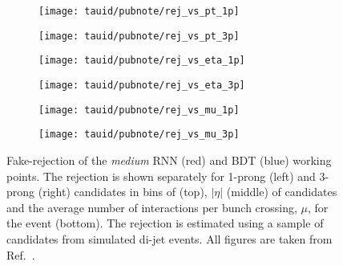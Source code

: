 \begin{figure}[htbp]

  \begin{subfigure}{0.498\textwidth}
    \texttt{[image: tauid/pubnote/rej\_vs\_pt\_1p]}
    \subcaption{}%
    \label{fig:tauid_faketau_rej_a}
  \end{subfigure}\hfill%
  \begin{subfigure}{0.498\textwidth}
    \texttt{[image: tauid/pubnote/rej\_vs\_pt\_3p]}
    \subcaption{}%
    \label{fig:tauid_faketau_rej_b}
  \end{subfigure}

  \begin{subfigure}{0.498\textwidth}
    \texttt{[image: tauid/pubnote/rej\_vs\_eta\_1p]}
    \subcaption{}
  \end{subfigure}\hfill%
  \begin{subfigure}{0.498\textwidth}
    \texttt{[image: tauid/pubnote/rej\_vs\_eta\_3p]}
    \subcaption{}
  \end{subfigure}

  \begin{subfigure}{0.498\textwidth}
    \texttt{[image: tauid/pubnote/rej\_vs\_mu\_1p]}
    \subcaption{}%
    \label{fig:tauid_faketau_rej_e}
  \end{subfigure}\hfill%
  \begin{subfigure}{0.498\textwidth}
    \texttt{[image: tauid/pubnote/rej\_vs\_mu\_3p]}
    \subcaption{}%
    \label{fig:tauid_faketau_rej_f}
  \end{subfigure}

  \caption{Fake-\tauhadvis rejection of the \emph{medium} RNN (red)
    and BDT (blue) \tauid working points. The rejection is shown
    separately for 1-prong (left) and 3-prong (right) \tauhadvis
    candidates in bins of \pT (top), $|\eta|$ (middle) of \tauhadvis
    candidates and the average number of interactions per bunch
    crossing, $\mu$, for the event (bottom). The rejection is
    estimated using a sample of \tauhadvis candidates from simulated
    di-jet events. All figures are taken from
    Ref.~\cite{ATL-PHYS-PUB-2019-033}.}%
  \label{fig:tauid_faketau_rej}
\end{figure}


